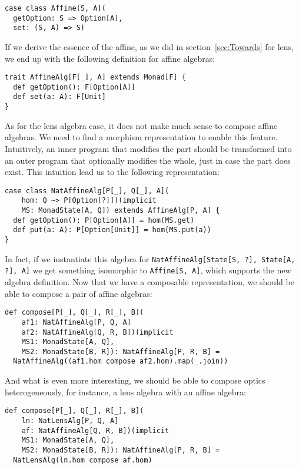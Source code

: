 \documentclass[preview, 3p]{elsarticle}
\begin{document}
\begin{lstlisting}
case class Affine[S, A](
  getOption: S => Option[A],
  set: (S, A) => S)
\end{lstlisting}

If we derive the essence of the affine, as we did in section~\ref{sec:Towards}
for lens, we end up with the following definition for affine algebras:

\begin{lstlisting}
trait AffineAlg[F[_], A] extends Monad[F] {
  def getOption(): F[Option[A]]
  def set(a: A): F[Unit]
}
\end{lstlisting}

As for the lens algebra case, it does not make much sense to compose affine
algebras. We need to find a morphism representation to enable this feature.
Intuitively, an inner program that modifies the part should be transformed into
an outer program that optionally modifies the whole, just in case the part does
exist. This intuition lead us to the following representation:

\begin{lstlisting}
case class NatAffineAlg[P[_], Q[_], A](
    hom: Q ~> P[Option[?]])(implicit
    MS: MonadState[A, Q]) extends AffineAlg[P, A] {
  def getOption(): P[Option[A]] = hom(MS.get)
  def put(a: A): P[Option[Unit]] = hom(MS.put(a))
}
\end{lstlisting}

In fact, if we instantiate this algebra for
\lstinline{NatAffineAlg[State[S, ?], State[A, ?], A]} we get something
isomorphic to \lstinline{Affine[S, A]}, which supports the new algebra
definition. Now that we have a composable representation, we should be able to
compose a pair of affine algebras:

\begin{lstlisting}
def compose[P[_], Q[_], R[_], B](
    af1: NatAffineAlg[P, Q, A]
    af2: NatAffineAlg[Q, R, B])(implicit
    MS1: MonadState[A, Q],
    MS2: MonadState[B, R]): NatAffineAlg[P, R, B] =
  NatAffineAlg((af1.hom compose af2.hom).map(_.join))
\end{lstlisting}

And what is even more interesting, we should be able to compose optics
heterogeneously, for instance, a lens algebra with an affine algebra:

\begin{lstlisting}
def compose[P[_], Q[_], R[_], B](
    ln: NatLensAlg[P, Q, A]
    af: NatAffineAlg[Q, R, B])(implicit
    MS1: MonadState[A, Q],
    MS2: MonadState[B, R]): NatAffineAlg[P, R, B] =
  NatLensAlg(ln.hom compose af.hom)
\end{lstlisting}
\end{document}
